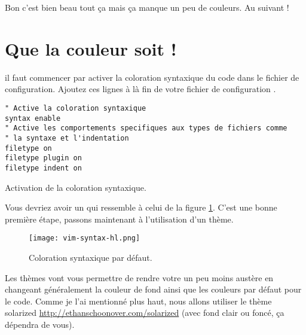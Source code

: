 Bon c'est bien beau tout ça mais ça manque un peu de couleurs. Au suivant !

\section{Que la couleur soit !}

 il faut commencer par activer la coloration syntaxique du code dans le fichier de configuration. Ajoutez ces lignes à là fin de votre fichier de configuration \vimrc.

\begin{listing}[H]
\begin{verbatim}
" Active la coloration syntaxique
syntax enable
" Active les comportements specifiques aux types de fichiers comme
" la syntaxe et l'indentation
filetype on
filetype plugin on
filetype indent on
\end{verbatim}
  \caption{Activation de la coloration syntaxique.}
  \label{lst:syntax-hl}
\end{listing}

Vous devriez avoir un \vim qui ressemble à celui de la figure \ref{fig:syntax-hl}. C'est une bonne première étape, passons maintenant à l'utilisation d'un thème.

\begin{figure}%
  \texttt{[image: vim-syntax-hl.png]}
  \caption{Coloration syntaxique par défaut.}
  \label{fig:syntax-hl}
\end{figure}

Les thèmes vont vous permettre de rendre votre \vim un peu moins austère en changeant généralement la couleur de fond ainsi que les couleurs par défaut pour le code. Comme je l'ai mentionné plus haut, nous allons utiliser le thème solarized \url{http://ethanschoonover.com/solarized} (avec fond clair ou foncé, ça dépendra de vous).

